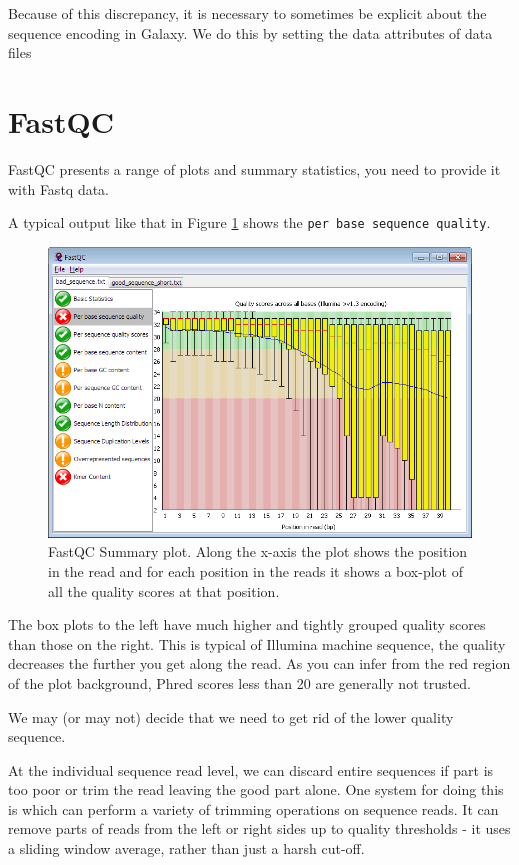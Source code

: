 \documentclass[12pt,]{book}
\theoremstyle{definition}
\theoremstyle{definition}
\theoremstyle{remark}
\begin{document}
Because of this discrepancy, it is necessary to sometimes be explicit
about the sequence encoding in Galaxy. We do this by setting the data
attributes of data files

\section{FastQC}\label{fastqc}

FastQC presents a range of plots and summary statistics, you need to
provide it with Fastq data.

A typical output like that in Figure \ref{fig:fastqc} shows the
\texttt{per\ base\ sequence\ quality}.





\begin{figure}
\includegraphics[width=5.08in]{assets/fastqc} \caption{FastQC Summary plot. Along the x-axis the plot shows
the position in the read and for each position in the reads it shows a
box-plot of all the quality scores at that position.}\label{fig:fastqc}
\end{figure}

The box plots to the left have much higher and tightly grouped quality
scores than those on the right. This is typical of Illumina machine
sequence, the quality decreases the further you get along the read. As
you can infer from the red region of the plot background, Phred scores
less than 20 are generally not trusted.

We may (or may not) decide that we need to get rid of the lower quality
sequence.

At the individual sequence read level, we can discard entire sequences
if part is too poor or trim the read leaving the good part alone. One
system for doing this is \citep{Bolger:2014ek} which can perform a
variety of trimming operations on sequence reads. It can remove parts of
reads from the left or right sides up to quality thresholds - it uses a
sliding window average, rather than just a harsh cut-off.
\end{document}
